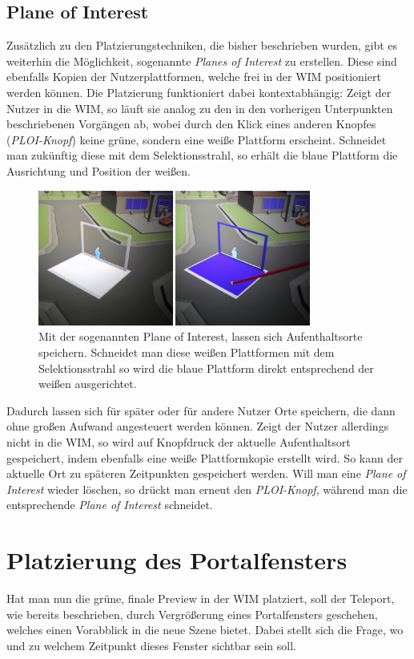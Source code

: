 \subsection{Plane of Interest}

Zusätzlich zu den Platzierungstechniken, die bisher beschrieben wurden, gibt es weiterhin die Möglichkeit, sogenannte \textit{Planes of Interest} zu erstellen. Diese sind ebenfalls Kopien der Nutzerplattformen, welche frei in der WIM positioniert werden können. Die Platzierung funktioniert dabei kontextabhängig:
Zeigt der Nutzer in die WIM, so läuft sie analog zu den in den vorherigen Unterpunkten beschriebenen Vorgängen ab, wobei durch den Klick eines anderen Knopfes (\textit{PLOI-Knopf}) keine grüne, sondern eine weiße Plattform erscheint. Schneidet man zukünftig diese mit dem Selektionsstrahl, so erhält die blaue Plattform die Ausrichtung und Position der weißen.

\begin{figure}[h!]
  \centering
  \includegraphics[width=0.8\textwidth]{images/platform_bluewhite.JPG}
  \caption{Mit der sogenannten \glqq Plane of Interest\grqq{}, lassen sich Aufenthaltsorte speichern. Schneidet man diese weißen Plattformen mit dem Selektionsstrahl so wird die blaue Plattform direkt entsprechend der weißen ausgerichtet.}
  \label{fig:todo}
\end{figure}

Dadurch lassen sich für später oder für andere Nutzer Orte speichern, die dann ohne großen Aufwand angesteuert werden können.
Zeigt der Nutzer allerdings nicht in die WIM, so wird auf Knopfdruck der aktuelle Aufenthaltsort gespeichert, indem ebenfalls eine weiße Plattformkopie erstellt wird. So kann der aktuelle Ort zu späteren Zeitpunkten gespeichert werden.
Will man eine \textit{Plane of Interest} wieder löschen, so drückt man erneut den \textit{PLOI-Knopf}, während man die entsprechende \textit{Plane of Interest} schneidet.


\section{Platzierung des Portalfensters}
Hat man nun die grüne, finale Preview in der WIM platziert, soll der Teleport, wie bereits beschrieben, durch Vergrößerung eines Portalfensters geschehen, welches einen Vorabblick in die neue Szene bietet. Dabei stellt sich die Frage, wo und zu welchem Zeitpunkt dieses Fenster sichtbar sein soll.

